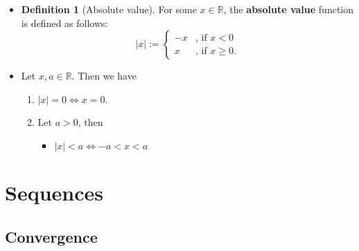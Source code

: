 \documentclass{article}
\newcommand{\R}{\mathbb{R}}
\newcommand{\?}{\stackrel{?}{=}}
\newcommand{\smallblacksquare}{\rule{0.5em}{0.5em}}
\theoremstyle{definition} %
\newtheorem{definition}[subsection]{Definition} %
\begin{document}
\begin{itemize}
    \item[]
          \begin{definition}[Absolute value]
              For some $x \in \R$, the \textbf{absolute value} function is defined as follows:
              \[ |x| := \begin{cases}
                      -x & \text{, if } x < 0     \\
                      x  & \text{, if } x \geq 0.
                  \end{cases} \]
          \end{definition}
    \item[]
          \begin{proposition}
              Let $x, a \in \R$. Then we have
              \begin{enumerate}[label=(\roman*)]
                  \item $|x| = 0 \iff x = 0$.
                  \item Let $a > 0$, then
                        \begin{itemize}[label=\smallblacksquare]
                            \item $|x| < a \iff -a < x < a$
                        \end{itemize}
              \end{enumerate}
          \end{proposition}
\end{itemize}

\section{Sequences}

\subsection{Convergence}
\end{document}
